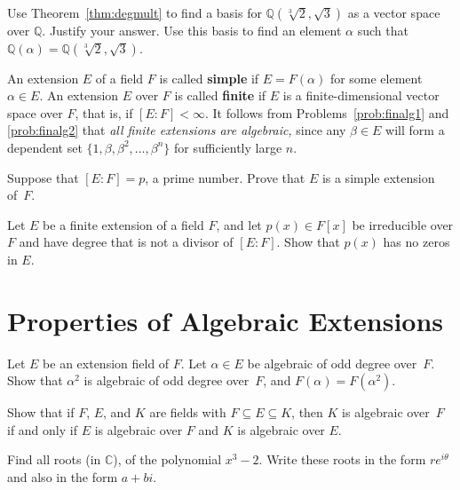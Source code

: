 \begin{problem}
    Use Theorem~\ref{thm:degmult}  to find  a basis for $\mathbb{Q}\left(\sqrt[3]{2},\sqrt{3}\right)$ as a vector space over $\mathbb{Q}$.  Justify your answer. Use this basis to find an element $\alpha$ such that $\mathbb{Q}(\alpha) = \mathbb{Q}\left(\sqrt[3]{2},\sqrt{3}\right)$.
\end{problem}

An extension $E$ of a field $F$ is called \textbf{simple} if $E=F(\alpha)$ for some element $\alpha \in E$. An extension $E$ over $F$ is called \textbf{finite} if $E$ is a finite-dimensional vector space over $F$, that is, if $[E:F]<\infty$. It follows from Problems~\ref{prob:finalg1} and \ref{prob:finalg2} that \textit{all finite extensions are algebraic,} since any $\beta\in E$ will form a dependent set $\{1, \beta, \beta^2, \ldots,\beta^n\}$ for sufficiently large $n$.

\begin{problem}
    Suppose that $[E:F]=p$, a prime number. Prove that $E$ is a simple extension of~$F$.
\end{problem}

\begin{problem}
Let $E$ be a finite extension of a field $F$, and let $p(x) \in F[x]$ be irreducible over $F$ and have degree that is not a divisor of $[E:F]$.  Show that $p(x)$ has no zeros in $E$.
\end{problem}

\section{Properties of Algebraic Extensions}

\begin{problem}
Let $E$ be an extension field of $F$.  Let $\alpha \in E$ be algebraic of odd degree over~$F$.  Show that $\alpha^2$ is algebraic of odd degree over~$F$, and $F(\alpha) = F(\alpha^2)$.
\end{problem}

\begin{problem}
Show that if $F$, $E$, and $K$ are fields with $F \subseteq E \subseteq K$, then $K$ is algebraic over~$F$ if and only if $E$ is algebraic over $F$ and $K$ is algebraic over $E$.
\end{problem}

\begin{problem}\label{prob:polarform}
    Find all roots (in $\mathbb{C}$), of the polynomial $x^3-2$. Write these roots in the form $re^{i\theta}$ and also in the form $a+bi$.
\begin{annotation}
\end{annotation}
\end{problem}


